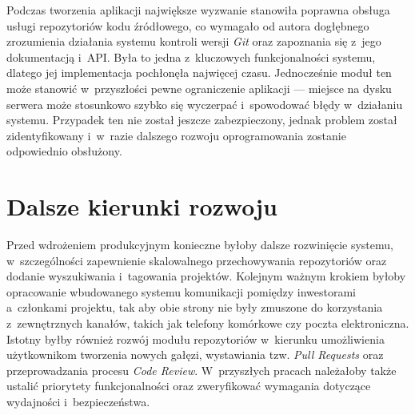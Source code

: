 Podczas tworzenia aplikacji największe wyzwanie stanowiła poprawna obsługa usługi repozytoriów kodu źródłowego, co wymagało od autora dogłębnego zrozumienia działania systemu kontroli wersji \textit{Git} oraz zapoznania się z~jego dokumentacją i~API. Była to jedna z~kluczowych funkcjonalności systemu, dlatego jej implementacja pochłonęła najwięcej czasu. Jednocześnie moduł ten może stanowić w~przyszłości pewne ograniczenie aplikacji --- miejsce na dysku serwera może stosunkowo szybko się wyczerpać i~spowodować błędy w~działaniu systemu. Przypadek ten nie został jeszcze zabezpieczony, jednak problem został zidentyfikowany i~w~razie dalszego rozwoju oprogramowania zostanie odpowiednio obsłużony.

\section{Dalsze kierunki rozwoju} 
Przed wdrożeniem produkcyjnym konieczne byłoby dalsze rozwinięcie systemu, w~szczególności zapewnienie skalowalnego przechowywania repozytoriów oraz dodanie wyszukiwania i~tagowania projektów. 
Kolejnym ważnym krokiem byłoby opracowanie wbudowanego systemu komunikacji pomiędzy inwestorami a~członkami projektu, tak aby obie strony nie były zmuszone do korzystania z~zewnętrznych kanałów, takich jak telefony komórkowe czy poczta elektroniczna. 
Istotny byłby również rozwój modułu repozytoriów w~kierunku umożliwienia użytkownikom tworzenia nowych gałęzi, wystawiania tzw. \emph{Pull Requests} oraz przeprowadzania procesu \emph{Code Review}. 
W~przyszłych pracach należałoby także ustalić priorytety funkcjonalności oraz zweryfikować wymagania dotyczące wydajności i~bezpieczeństwa.